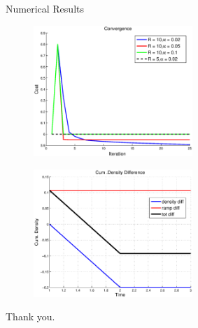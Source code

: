 \documentclass[xcolor=svgnames, english, smaller]{beamer}
\theoremstyle{plain}
\theoremstyle{definition}
\theoremstyle{plain}
\theoremstyle{plain}
\begin{document}
\begin{frame}{Numerical Results}

\begin{minipage}[t]{0.48\linewidth}
\begin{figure}[h]
\includegraphics[width=60mm]{convergence.eps}
\end{figure}
\end{minipage}\hfill
\begin{minipage}[t]{0.48\linewidth}
\begin{figure}[h]
\includegraphics[width=60mm]{cumDiff}
\end{figure}
\end{minipage}

\end{frame}

\begin{frame}
\large
\begin{center}
Thank you.
\end{center}
\end{frame}
\end{document}
